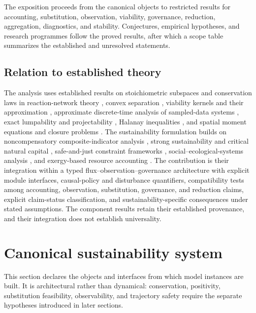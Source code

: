 \documentclass[11pt]{article}
\theoremstyle{definition}
\begin{document}
The exposition proceeds from the canonical objects to restricted results for accounting, substitution, observation, viability, governance, reduction, aggregation, diagnostics, and stability. Conjectures, empirical hypotheses, and research programmes follow the proved results, after which a scope table summarizes the established and unresolved statements.

\subsection{Relation to established theory}

The analysis uses established results on stoichiometric subspaces and conservation laws in reaction-network theory \cite{feinberg2019}, convex separation \cite{rockafellar1970}, viability kernels and their approximation \cite{aubin1991,saintpierre1994}, approximate discrete-time analysis of sampled-data systems \cite{nesic2004}, exact lumpability and projectability \cite{li1989,horstmeyer2016}, Halanay inequalities \cite{halanay1966}, and spatial moment equations and closure problems \cite{bolker1997,murrell2004}. The sustainability formulation builds on noncompensatory composite-indicator analysis \cite{munda2009}, strong sustainability and critical natural capital \cite{neumayer2013,ekins2003}, safe-and-just constraint frameworks \cite{oneill2018,rockstrom2023}, social--ecological-systems analysis \cite{ostrom2009}, and exergy-based resource accounting \cite{dewulf2008}. The contribution is their integration within a typed flux--observation--governance architecture with explicit module interfaces, causal-policy and disturbance quantifiers, compatibility tests among accounting, observation, substitution, governance, and reduction claims, explicit claim-status classification, and sustainability-specific consequences under stated assumptions. The component results retain their established provenance, and their integration does not establish universality.

\section{Canonical sustainability system}

This section declares the objects and interfaces from which model instances are built. It is architectural rather than dynamical: conservation, positivity, substitution feasibility, observability, and trajectory safety require the separate hypotheses introduced in later sections.
\end{document}
